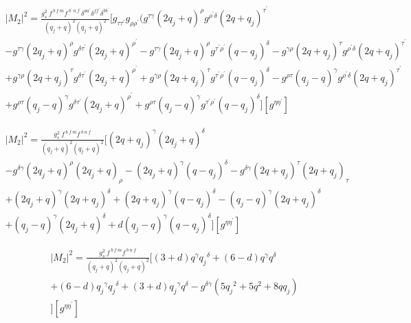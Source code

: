 \begin{equation}
\begin{split}
|M_2|^2=\frac{g_s^2\: f^{\:b\:f\:m} f^{\:b^{\prime}\:n\:f^{\prime}} {\delta}^{{a}{a^{\prime}}} {\delta}^{{f}{f^{\prime}}} {\delta}^{{b}{b^{\prime}}}}{(q_j +q)^2 (q_j +q)^2}[g_{{\tau}{{\tau}^{\prime}}}g_{{\rho}{{\rho}^{\prime}}}(g^{{\tau}{\gamma}}(2q_j+q)^{\rho}g^{{{\rho}^{\prime}}{{\delta}}}(2q+q_j)^{{\tau}^{\prime}}\\
-g^{{\tau}{\gamma}}(2q_j+q)^{\rho}g^{{{\delta}}{{\tau}^{\prime}}}(2q_j +q)^{{\rho}^{\prime}}-g^{{\tau}{\gamma}}(2q_j+q)^{\rho}g^{{{\tau}^{\prime}}{{\rho}^{\prime}}}(q-q_j)^{{\delta}}-g^{{\gamma}{\rho}}(2q +q_j)^{\tau}g^{{{\rho}^{\prime}}{{\delta}}}(2q+q_j)^{{\tau}^{\prime}}\\
+g^{{\gamma}{\rho}}(2q +q_j)^{\tau}g^{{{\delta}}{{\tau}^{\prime}}}(2q_j +q)^{{\rho}^{\prime}}+g^{{\gamma}{\rho}}(2q +q_j)^{\tau}g^{{{\tau}^{\prime}}{{\rho}^{\prime}}}(q-q_j)^{{\delta}}-g^{{\rho}{\tau}}(q_j -q)^{\gamma}g^{{{\rho}^{\prime}}{{\delta}}}(2q+q_j)^{{\tau}^{\prime}}\\
+g^{{\rho}{\tau}}(q_j -q)^{\gamma}g^{{{\delta}}{{\tau}^{\prime}}}(2q_j +q)^{{\rho}^{\prime}}
+g^{{\rho}{\tau}}(q_j -q)^{\gamma}g^{{{\tau}^{\prime}}{{\rho}^{\prime}}}(q-q_j)^{{\delta}}
][g^{{\eta}{{\eta}^{\prime}}}]
\end{split}
\end{equation}


\begin{equation}
\begin{split}
|M_2|^2=\frac{g_s^2\: f^{\:b\:f\:m} f^{\:b\:n\:f}}{(q_j +q)^2 (q_j +q)^2}[(2q+q_j)^{{\gamma}}(2q_j+q)^{\delta}\\
-g^{{\delta}{\gamma}}(2q_j+q)^{\rho}(2q_j +q)_{{\rho}}-(2q_j+q)^{\gamma}(q-q_j)^{{\delta}}-g^{{\delta}{\gamma}}(2q +q_j)^{\tau}(2q+q_j)_{{\tau}}\\
+(2q_j +q)^{{\gamma}}(2q +q_j)^{\delta}+(2q +q_j)^{\gamma}(q-q_j)^{{\delta}}-(q_j -q)^{\gamma}(2q+q_j)^{{\delta}}\\
+(q_j -q)^{\gamma}(2q_j +q)^{{\delta}}+d(q_j -q)^{\gamma}(q-q_j)^{{\delta}}][g^{{\eta}{{\eta}^{\prime}}}]
\end{split}
\end{equation}


\begin{equation}
\begin{split}
|M_2|^2=\frac{g_s^2\: f^{\:b\:f\:m} f^{\:b\:n\:f}}{(q_j +q)^2 (q_j +q)^2}[(3+d)q^{\gamma}{q_j}^{\delta}+(6-d)q^{\gamma}{q}^{\delta}\\+(6-d){q_j}^{\gamma}{q_j}^{\delta}+(3+d){q_j}^{\gamma}{q}^{\delta}-g^{{\delta}{\gamma}}(5{q_j}^2+5q^2+8qq_j)\\
][g^{{\eta}{{\eta}^{\prime}}}]
\end{split}
\end{equation}





